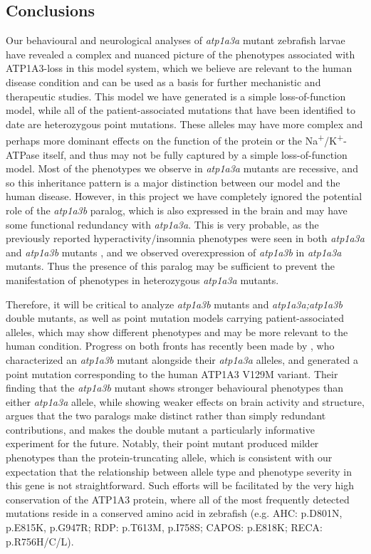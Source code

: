\documentclass[9.5pt,lineno]{RandlettLab_elife}
\begin{document}
\subsection{Conclusions}

Our behavioural and neurological analyses of \emph{atp1a3a} mutant zebrafish larvae have revealed a complex and nuanced picture of the phenotypes associated with ATP1A3-loss in this model system, which we believe are relevant to the human disease condition and can be used as a basis for further mechanistic and therapeutic studies.
This model we have generated is a simple loss-of-function model, while all of the patient-associated mutations that have been identified to date are heterozygous point mutations.
These alleles may have more complex and perhaps more dominant effects on the function of the protein or the Na\textsuperscript{+}/K\textsuperscript{+}-ATPase itself, and thus may not be fully captured by a simple loss-of-function model.
Most of the phenotypes we observe in \emph{atp1a3a} mutants are recessive, and so this inheritance pattern is a major distinction between our model and the human disease. However, in this project we have completely ignored the potential role of the \emph{atp1a3b} paralog, which is also expressed in the brain and may have some functional redundancy with \emph{atp1a3a}. 
This is very probable, as the previously reported hyperactivity/insomnia phenotypes were seen in both \emph{atp1a3a} and \emph{atp1a3b} mutants \citep{Barlow2023}, and we observed overexpression of \emph{atp1a3b} in \emph{atp1a3a} mutants.
Thus the presence of this paralog may be sufficient to prevent the manifestation of phenotypes in heterozygous \emph{atp1a3a} mutants.

Therefore, it will be critical to analyze \emph{atp1a3b} mutants and \emph{atp1a3a;atp1a3b} double mutants, as well as point mutation models carrying patient-associated alleles, which may show different phenotypes and may be more relevant to the human condition.
Progress on both fronts has recently been made by \citet{Moyer2026}, who characterized an \emph{atp1a3b} mutant alongside their \emph{atp1a3a} alleles, and generated a point mutation corresponding to the human ATP1A3 V129M variant.
Their finding that the \emph{atp1a3b} mutant shows stronger behavioural phenotypes than either \emph{atp1a3a} allele, while showing weaker effects on brain activity and structure, argues that the two paralogs make distinct rather than simply redundant contributions, and makes the double mutant a particularly informative experiment for the future.
Notably, their point mutant produced milder phenotypes than the protein-truncating allele, which is consistent with our expectation that the relationship between allele type and phenotype severity in this gene is not straightforward.
Such efforts will be facilitated by the very high conservation of the ATP1A3 protein, where all of the most frequently detected mutations reside in a conserved amino acid in zebrafish (e.g. AHC: p.D801N, p.E815K, p.G947R; RDP: p.T613M, p.I758S; CAPOS: p.E818K; RECA: p.R756H/C/L).
\end{document}
